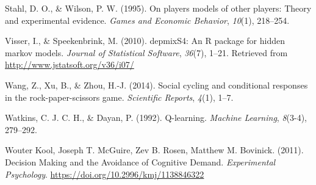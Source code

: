 \documentclass[man,floatsintext]{apa6}
\begin{document}
\leavevmode\hypertarget{ref-stahl1995players}{}%
Stahl, D. O., \& Wilson, P. W. (1995). On players models of other players: Theory and experimental evidence. \emph{Games and Economic Behavior}, \emph{10}(1), 218--254.

\leavevmode\hypertarget{ref-R-depmixS4}{}%
Visser, I., \& Speekenbrink, M. (2010). depmixS4: An R package for hidden markov models. \emph{Journal of Statistical Software}, \emph{36}(7), 1--21. Retrieved from \url{http://www.jstatsoft.org/v36/i07/}

\leavevmode\hypertarget{ref-wang2014social}{}%
Wang, Z., Xu, B., \& Zhou, H.-J. (2014). Social cycling and conditional responses in the rock-paper-scissors game. \emph{Scientific Reports}, \emph{4}(1), 1--7.

\leavevmode\hypertarget{ref-watkins1992q}{}%
Watkins, C. J. C. H., \& Dayan, P. (1992). Q-learning. \emph{Machine Learning}, \emph{8}(3-4), 279--292.

\leavevmode\hypertarget{ref-Kool_2011}{}%
Wouter Kool, Joseph T. McGuire, Zev B. Rosen, Matthew M. Bovinick. (2011). Decision Making and the Avoidance of Cognitive Demand. \emph{Experimental Psychology}. \url{https://doi.org/10.2996/kmj/1138846322}
\end{document}
